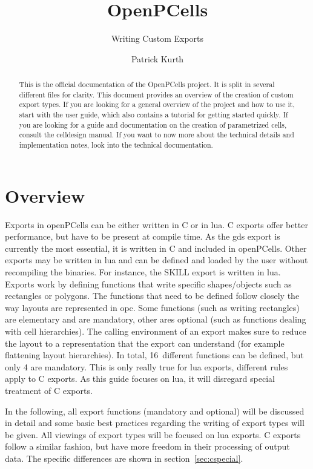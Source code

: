

\title{OpenPCells}
\subtitle{Writing Custom Exports}
\author{Patrick Kurth}


\maketitle
\begin{abstract}
    \noindent This is the official documentation of the OpenPCells project. It is split in several different files for clarity. 
    This document provides an overview of the creation of custom export types.
    If you are looking for a general overview of the project and how to use it, start with the user guide, which also contains a tutorial for getting started quickly. 
    If you are looking for a guide and documentation on the creation of parametrized cells, consult the celldesign manual.
    If you want to now more about the technical details and implementation notes, look into the technical documentation.
\end{abstract}

\section{Overview}
Exports in openPCells can be either written in C or in lua.
C exports offer better performance, but have to be present at compile time.
As the gds export is currently the most essential, it is written in C and included in openPCells.
Other exports may be written in lua and can be defined and loaded by the user without recompiling the binaries.
For instance, the SKILL export is written in lua.
Exports work by defining functions that write specific shapes/objects such as rectangles or polygons.
The functions that need to be defined follow closely the way layouts are represented in opc.
Some functions (such as writing rectangles) are elementary and are mandatory, other ares optional (such as functions dealing with cell hierarchies).
The calling environment of an export makes sure to reduce the layout to a representation that the export can understand (for example flattening layout hierarchies).
In total, 16~different functions can be defined, but only 4 are mandatory.
This is only really true for lua exports, different rules apply to C exports.
As this guide focuses on lua, it will disregard special treatment of C exports.

In the following, all export functions (mandatory and optional) will be discussed in detail and some basic best practices regarding the writing of export types will be given.
All viewings of export types will be focused on lua exports.
C exports follow a similar fashion, but have more freedom in their processing of output data.
The specific differences are shown in section~\ref{sec:cspecial}.

